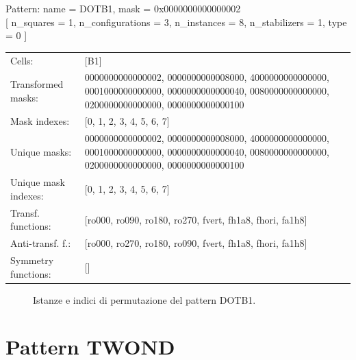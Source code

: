 \begin{tcolorbox}[sharp corners, fontupper=\ttfamily\small, colback=white]
  \noindent Pattern: name = DOTB1, mask = 0x0000000000000002\\
  {[} n\_squares = 1, n\_configurations = 3,
  n\_instances = 8, n\_stabilizers = 1, type = 0 { ]}\\[1.0ex]
  \begin{tabularx}{\textwidth}{@{} p{3.5cm} X @{}}
    Cells:               & {[}B1{]}\\[0.5ex]
    Transformed masks:   & 0000000000000002, 0000000000008000, 4000000000000000, 0001000000000000, 0000000000000040, 0080000000000000, 0200000000000000, 0000000000000100\\[0.5ex]
    Mask indexes:        & {[}0, 1, 2, 3, 4, 5, 6, 7{]}\\[0.5ex]
    Unique masks:        & 0000000000000002, 0000000000008000, 4000000000000000, 0001000000000000, 0000000000000040, 0080000000000000, 0200000000000000, 0000000000000100\\[0.5ex]
    Unique mask indexes: & {[}0, 1, 2, 3, 4, 5, 6, 7{]}\\[0.5ex]
    Transf. functions:   & {[}ro000, ro090, ro180, ro270, fvert, fh1a8, fhori, fa1h8{]}\\[0.5ex]
    Anti-transf. f.:     & {[}ro000, ro270, ro180, ro090, fvert, fh1a8, fhori, fa1h8{]}\\[0.5ex]
    Symmetry functions:  & {[}{]}\\[0.5ex]
  \end{tabularx}
\end{tcolorbox}

\begin{figure}[htbp]
  \centering
   \hfill
   \hfill
   \hfill
  \vspace{0.3cm}
   \hfill
   \hfill
   \hfill
  \caption{Istanze e indici di permutazione del pattern DOTB1.}
\end{figure}

\newpage

\section{Pattern TWOND}

